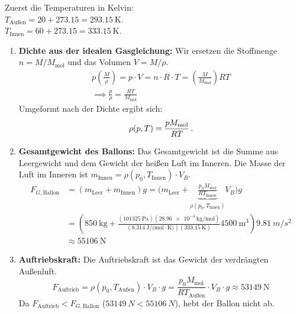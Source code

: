 \documentclass[ngerman]{scrreprt}
\newenvironment{loesungbox}[1]
  {\needspace{5\baselineskip}\begin{loesungboxstyle}[frametitle={#1}]}
  {\end{loesungboxstyle}}
\begin{document}
\begin{loesungbox}{Lösung zu \Cref{aufg:ballonfahrt}}
Zuerst die Temperaturen in Kelvin: \\
$T_{\text{Außen}} = 20 + 273.15 = \SI{293.15}{\kelvin}$. \\
$T_{\text{Innen}} = 60 + 273.15 = \SI{333.15}{\kelvin}$. 
\begin{enumerate}
    \item \textbf{Dichte aus der idealen Gasgleichung:}
    Wir ersetzen die Stoffmenge $n = M / M_{\text{mol}}$ und das Volumen $V = M / \rho$. 
    \begin{gather}
        p \left(\frac{M}{\rho}\right) = p\cdot V = n \cdot R \cdot T = \left(\frac{M}{M_{\text{mol}}}\right) R T \nonumber\\
        \implies \frac{p}{\rho} = \frac{RT}{M_{\text{mol}}}
    \end{gather}
    Umgeformt nach der Dichte ergibt sich:
    \begin{equation} \label{eq: dichte_gas}
        \rho(p, T) = \frac{p M_{\text{mol}}}{R T} \,.
    \end{equation}
    
    \item \textbf{Gesamtgewicht des Ballons:}
    Das Gesamtgewicht ist die Summe aus Leergewicht und dem Gewicht der heißen Luft im Inneren. Die Masse der Luft im Inneren ist $m_{\text{Innen}} = \rho(p_0, T_{\text{Innen}}) \cdot V_B$. 
    \begin{align}
        F_{G, \text{Ballon}} &= (m_{\text{Leer}} + m_{\text{Innen}})g = \big(m_{\text{Leer}} + \underbrace{\frac{p_0 M_{\text{mol}}}{R T_{\text{Innen}}}}_{\rho(p_0, T_{\text{Innen}})} V_B\big)g \nonumber\\
        &= \left(\SI{850}{\kilo\gram} + \frac{(\SI{101325}{\pascal})(\SI{28.96e-3}{\kilo\gram\per\mole})}{(\SI{8.314}{\joule\per(\mole\cdot\kelvin)})(\SI{333.15}{\kelvin})} \SI{4500}{\meter^3}\right) \SI{9.81}{m/s^2} \nonumber\\
        &\approx \SI{55106}{\newton}
    \end{align}
    
    \item \textbf{Auftriebskraft:}
    Die Auftriebskraft ist das Gewicht der verdrängten Außenluft. 
    \begin{equation}
        F_{\text{Auftrieb}} = \rho(p_0, T_{\text{Außen}}) \cdot V_B \cdot g = \frac{p_0 M_{\text{mol}}}{R T_{\text{Außen}}} \cdot V_B \cdot g \approx \SI{53149}{\newton}
    \end{equation}
    Da $F_{\text{Auftrieb}} < F_{G, \text{Ballon}}$ ($\SI{53149}{N} < \SI{55106}{N}$), hebt der Ballon nicht ab. 
    

\end{enumerate}
\end{loesungbox}
\end{document}
